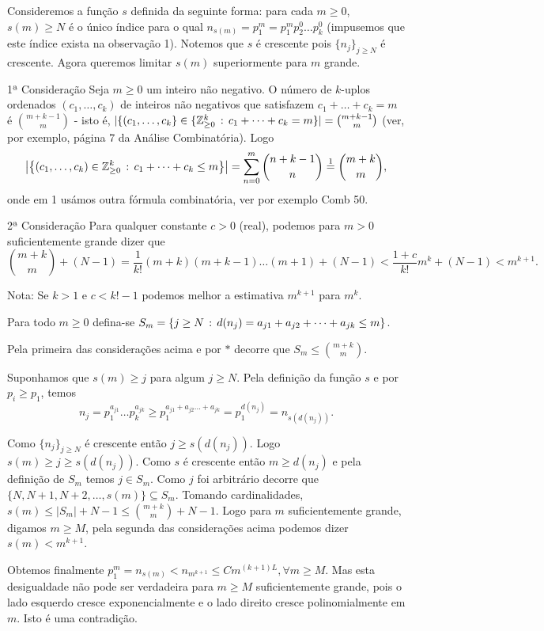 \documentclass[main.tex]{subfiles}
\newcommand*{\nj}{\ensuremath{\{n_j\}_{j\geq N}}}
\renewcommand*{\=}[1]{\ensuremath{\stackrel{\text{#1}}{=}}}
\begin{document}
\begin{solution}
Consideremos a função $s$ definida da seguinte forma:
para cada $m\geq 0$, $s(m)\geq N$ é o único índice para o qual
$n_{s(m)}=p_1^m=p_1^mp_2^0\dots p_k^0$
(impusemos que este índice exista na observação 1).
Notemos que $s$ é crescente pois $\nj$ é crescente.
Agora queremos limitar $s(m)$ superiormente para $m$ grande.

\begin{observation}{1ª Consideração}
Seja $m\geq 0$ um inteiro não negativo. O número de $k$-uplos ordenados
$(c_1,\dots,c_k)$ de inteiros não negativos que satisfazem
$c_1+\dots+c_k=m$ é $\binom{m+k-1}{m}$ - isto é,
$|\{(c_1,\dots,c_k\}\in\{\mathbb{Z}_{\geq 0}^k\,:\, c_1+\dots+c_k=m\}|
=\binom{m+k-1}{m}$
(ver, por exemplo, página 7 da Análise Combinatória).
Logo
\begin{equation*}
\left|\left\{(c_1,\dots,c_k)\in\mathbb{Z}_{\geq 0}^k\suchthat
c_1+\dots+c_k\leq m\right\}\right|
=\sum_{n=0}^m\binom{n+k-1}{n}\={1}\binom{m+k}{m},
\end{equation*}
onde em 1 usámos outra fórmula combinatória, ver por exemplo Comb 50.
\end{observation}

\begin{observation}{2ª Consideração}
Para qualquer constante $c>0$ (real), podemos para $m>0$ suficientemente
grande dizer que
\begin{equation*}
\binom{m+k}{m}+(N-1)=\frac{1}{k!}(m+k)(m+k-1)\dots(m+1)+(N-1)
<\frac{1+c}{k!}m^k+(N-1)<m^{k+1}.
\end{equation*}
\begin{footnotesize}
Nota: Se $k>1$ e $c<k!-1$ podemos melhor a estimativa $m^{k+1}$ para $m^k$.
\end{footnotesize}
\end{observation}

Para todo $m\geq 0$ defina-se
$S_m=\{j\geq N\,:\, d(n_j)=a_{j1}+a_{j2}+\dots+a_{jk}\leq m\}$.

Pela primeira das considerações acima e por $*$ decorre que
$S_m\leq\binom{m+k}{m}$.

Suponhamos que $s(m)\geq j$ para algum $j\geq N$.
Pela definição da função $s$ e por $p_i\geq p_1$, temos
\begin{equation*}
n_j=p_1^{a_{j1}}\dots p_k^{a_{jk}}
\geq p_1^{a_{j1}+a_{j2}\dots+a_{jk}}=p_1^{d(n_j)}=n_{s(d(n_j))}.
\end{equation*}

Como $\nj$ é crescente então $j\geq s(d(n_j))$.
Logo $s(m)\geq j\geq s(d(n_j))$.
Como $s$ é crescente então $m\geq d(n_j)$ e pela definição de $S_m$
temos $j\in S_m$.
Como $j$ foi arbitrário decorre que $\{N,N+1,N+2,\dots,s(m)\}\subseteq S_m$.
Tomando cardinalidades, $s(m)\leq |S_m|+N-1\leq\binom{m+k}{m}+N-1$.
Logo para $m$ suficientemente grande, digamos $m\geq M$,
pela segunda das considerações acima podemos dizer $s(m)<m^{k+1}$.

Obtemos finalmente $p_1^m=n_{s(m)}<n_{m^{k+1}}\leq Cm^{(k+1)L},\forall m\geq M$.
Mas esta desigualdade não pode ser verdadeira para $m\geq M$ suficientemente
grande, pois o lado esquerdo cresce exponencialmente e o lado direito
cresce polinomialmente em $m$. Isto é uma contradição.
\end{solution}
\end{document}
